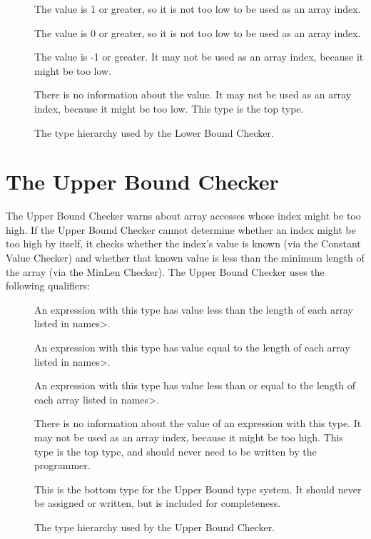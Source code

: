\begin{description}
\item[]
  The value is 1 or greater, so it is not too low to be used as an array index.
\item[]
  The value is 0 or greater, so it is not too low to be used as an array index.
\item[]
  The value is -1 or greater.
  It may not be used as an array index, because it might be too low.
\item[]
  There is no information about the value.
  It may not be used as an array index, because it might be too low.
  This type is the top type.
\end{description}

\begin{figure}
  \caption{The type hierarchy used by the Lower Bound Checker.}
  \label{fig-lowerbound-types}
\end{figure}


\section{The Upper Bound Checker\label{index-upperbound}}

The Upper Bound Checker warns about array accesses whose index might be
too high. If the Upper Bound Checker cannot determine whether an index might
be too high by itself, it checks whether the index's value is known (via the Constant
Value Checker) and whether that known value is less than the minimum length of the
array (via the MinLen Checker). The Upper Bound Checker uses the following
qualifiers:

\begin{description}
\item[]
  An expression with this type
  has value less than the length of each array listed in \<names>.
\item[]
  An expression with this type
  has value equal to the length of each array listed in \<names>.
\item[]
  An expression with this type
  has value less than or equal to the length of each array listed in \<names>.
\item[]
  There is no information about the value of an expression with this type.
  It may not be used as an array index, because it might be too high.
  This type is the top type, and should never need to be written by the
  programmer.
\item[]
  This is the bottom type for the Upper Bound type system. It should
  never be assigned or written, but is included for completeness.
  \end{description}

\begin{figure}
  \caption{The type hierarchy used by the Upper Bound Checker.}
  \label{fig-upperbound-types}
\end{figure}
